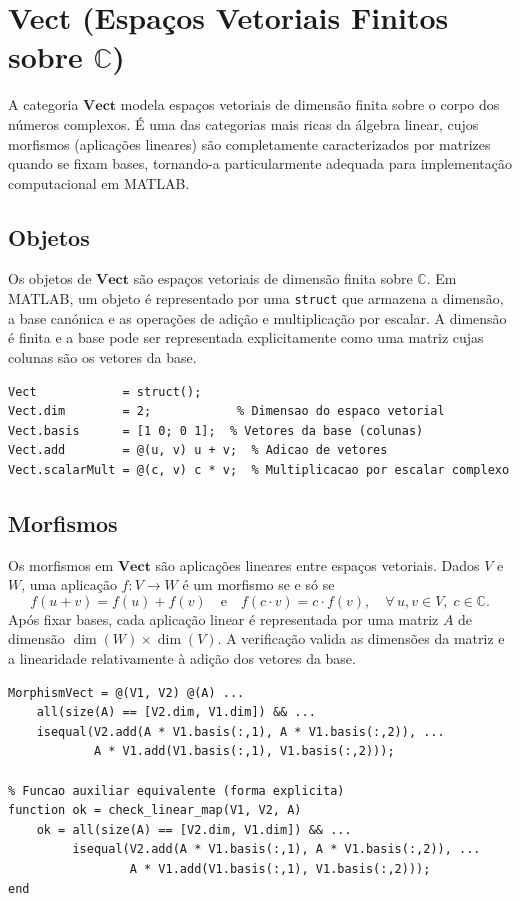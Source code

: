 \section{Vect (Espaços Vetoriais Finitos sobre \texorpdfstring{$\mathbb{C}$}{C})}
A categoria $\mathbf{Vect}$ modela espaços vetoriais de dimensão finita sobre o corpo dos números complexos. É uma das categorias mais ricas da álgebra linear, cujos morfismos (aplicações lineares) são completamente caracterizados por matrizes quando se fixam bases, tornando-a particularmente adequada para implementação computacional em MATLAB.

\subsection{Objetos}
Os objetos de $\mathbf{Vect}$ são espaços vetoriais de dimensão finita sobre $\mathbb{C}$. Em MATLAB, um objeto é representado por uma \texttt{struct} que armazena a dimensão, a base canónica e as operações de adição e multiplicação por escalar. A dimensão é finita e a base pode ser representada explicitamente como uma matriz cujas colunas são os vetores da base.

\begin{lstlisting}[caption={Representação de um espaço vetorial de dimensão 2 sobre $\mathbb{C}$}]
% Definicao de um espaco vetorial
Vect            = struct();
Vect.dim        = 2;            % Dimensao do espaco vetorial
Vect.basis      = [1 0; 0 1];  % Vetores da base (colunas)
Vect.add        = @(u, v) u + v;  % Adicao de vetores
Vect.scalarMult = @(c, v) c * v;  % Multiplicacao por escalar complexo
\end{lstlisting}

\subsection{Morfismos}
Os morfismos em $\mathbf{Vect}$ são aplicações lineares entre espaços vetoriais. Dados $V$ e $W$, uma aplicação $f: V \to W$ é um morfismo se e só se
\[
    f(u + v) = f(u) + f(v)
    \quad \text{e} \quad
    f(c \cdot v) = c \cdot f(v), \quad \forall\, u, v \in V,\; c \in \mathbb{C}.
\]
Após fixar bases, cada aplicação linear é representada por uma matriz $A$ de dimensão $\dim(W) \times \dim(V)$. A verificação valida as dimensões da matriz e a linearidade relativamente à adição dos vetores da base.

\begin{lstlisting}[caption={Verificação de aplicação linear (morfismo em $\mathbf{Vect}$)}]
% Construtor de verificador de morfismo (aplicacao linear) entre V1 e V2
MorphismVect = @(V1, V2) @(A) ...
    all(size(A) == [V2.dim, V1.dim]) && ...
    isequal(V2.add(A * V1.basis(:,1), A * V1.basis(:,2)), ...
            A * V1.add(V1.basis(:,1), V1.basis(:,2)));

% Funcao auxiliar equivalente (forma explicita)
function ok = check_linear_map(V1, V2, A)
    ok = all(size(A) == [V2.dim, V1.dim]) && ...
         isequal(V2.add(A * V1.basis(:,1), A * V1.basis(:,2)), ...
                 A * V1.add(V1.basis(:,1), V1.basis(:,2)));
end
\end{lstlisting}
